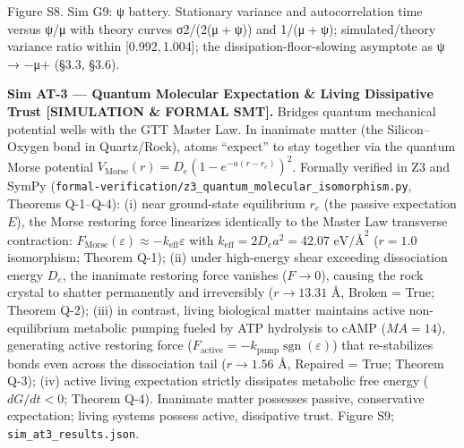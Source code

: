 \documentclass[
]{article}
\begin{document}
Figure S8. Sim G9: {ψ} battery. Stationary variance and autocorrelation
time versus {ψ/μ} with theory curves {σ2/(2(μ + ψ))} and {1/(μ + ψ)};
simulated/theory variance ratio within {{[}0.992, 1.004{]}}; the
dissipation-floor-slowing asymptote as {ψ → −μ+} (§3.3, §3.6).

\textbf{Sim AT-3 --- Quantum Molecular Expectation \& Living Dissipative
Trust {[}SIMULATION \& FORMAL SMT{]}.} Bridges quantum mechanical
potential wells with the GTT Master Law. In inanimate matter (the
Silicon--Oxygen bond in Quartz/Rock), atoms ``expect'' to stay together
via the quantum Morse potential
\(V_{\mathrm{Morse}}(r) = D_e(1 - e^{-a(r - r_e)})^2\). Formally
verified in Z3 and SymPy
(\texttt{formal-verification/z3\_quantum\_molecular\_isomorphism.py},
Theorems Q-1--Q-4): (i) near ground-state equilibrium \(r_e\) (the
passive expectation \(E\)), the Morse restoring force linearizes
identically to the Master Law transverse contraction:
\(F_{\mathrm{Morse}}(\varepsilon) \approx -k_{\mathrm{eff}}\varepsilon\)
with \(k_{\mathrm{eff}} = 2 D_e a^2 = 42.07\text{ eV/\AA}^2\)
(\(r = 1.0\) isomorphism; Theorem Q-1); (ii) under high-energy shear
exceeding dissociation energy \(D_e\), the inanimate restoring force
vanishes (\(F \to 0\)), causing the rock crystal to shatter permanently
and irreversibly (\(r \to 13.31\text{ \AA}\), Broken = True; Theorem
Q-2); (iii) in contrast, living biological matter maintains active
non-equilibrium metabolic pumping fueled by ATP hydrolysis to cAMP
(\(MA = 14\)), generating active restoring force
(\(F_{\mathrm{active}} = -k_{\mathrm{pump}}\operatorname{sgn}(\varepsilon)\))
that re-stabilizes bonds even across the dissociation tail
(\(r \to 1.56\text{ \AA}\), Repaired = True; Theorem Q-3); (iv) active
living expectation strictly dissipates metabolic free energy
(\(dG/dt < 0\); Theorem Q-4). Inanimate matter possesses passive,
conservative expectation; living systems possess active, dissipative
trust. Figure S9; \texttt{sim\_at3\_results.json}.
\end{document}
